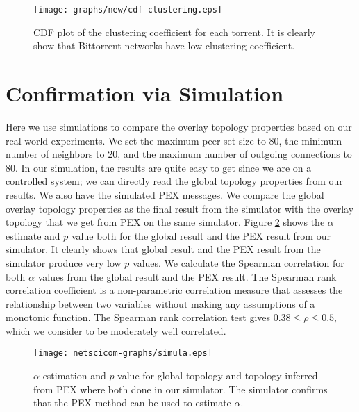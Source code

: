 \documentclass[paper]{ieice}
\begin{document}
\begin{figure}[tb]
\begin{center}
\texttt{[image: graphs/new/cdf-clustering.eps]}
\end{center}
\caption{CDF plot of the clustering coefficient for each torrent. It is clearly show that Bittorrent networks have low clustering coefficient.} 
\label{fig:cdf-clustering}
\end{figure}

\section{Confirmation via Simulation}\label{simulation}
Here we use simulations to compare the overlay topology properties based  on our real-world experiments. 
We set the maximum peer set size to 80, the minimum number of neighbors to 20, and the maximum number of outgoing connections to 80. 
In our simulation, the results are quite easy to get since we are on a controlled system;  we can directly read the  global topology properties from our results. 
We also have the simulated PEX messages. We compare the global overlay topology properties as the final result from the simulator with the overlay topology that we get from PEX on the same simulator.
Figure \ref{fig:simulation} shows the $\alpha$ estimate and $p$ value both for the global result and the PEX result from our simulator. 
It clearly shows that global result and the PEX result from the simulator produce very low $p$ values. 
We calculate the Spearman correlation for both $\alpha$ values from the global result and the PEX result. 
The Spearman rank correlation coefficient is a non-parametric correlation measure that assesses the relationship between two variables
without making any assumptions of a monotonic function.
The Spearman rank correlation test gives $0.38 \leq \rho \leq 0.5$, which we consider to be moderately well correlated. 

\begin{figure}[tb]
\begin{center}
\texttt{[image: netscicom-graphs/simula.eps]}
\end{center}
\caption{$\alpha$ estimation and $p$ value for global topology and topology inferred from PEX where both done in our simulator.
The simulator confirms that the PEX method can be used to estimate $\alpha$.} 
\label{fig:simulation}
\end{figure}
\end{document}
